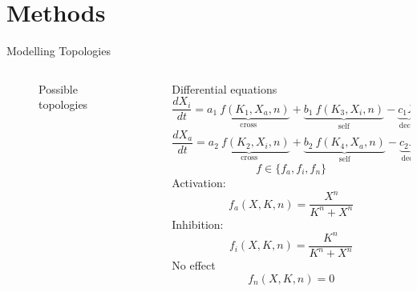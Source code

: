 \documentclass[aspectratio=169,9pt]{beamer}
\begin{document}
    \section{Methods}
    \begin{frame}{Modelling Topologies}
        \begin{columns}
            \begin{column}{0.3\textwidth}
                \begin{figure}
                    \centering
                    \caption{Possible topologies}
                \end{figure}
            \end{column}
            \pause
            \begin{column}{0.63\textwidth}
                Differential equations
                \begin{equation}
                    \frac{dX_i}{dt} = \underbrace{a_1\ f(K_1,X_a,n)}_\text{cross} + \underbrace{b_1\ f(K_3,X_i,n)}_\text{self} - \underbrace{c_1 X_i}_\text{decay}
                \end{equation}
                \begin{equation}
                    \frac{dX_a}{dt} = \underbrace{a_2\ f(K_2,X_i,n)}_\text{cross} + \underbrace{b_2\ f(K_4,X_a,n)}_\text{self} - \underbrace{c_2 X_a}_\text{decay}
                \end{equation}
                $$f \in \{ f_a, f_i, f_n\}$$
                \pause
                Activation:
                \begin{equation}
                    f_a(X,K,n) = \frac{{X}^n}{{K}^n+{X}^n}
                \end{equation}
                Inhibition:
                \begin{equation}
                    f_i(X,K,n) = \frac{{K}^n}{{K}^n+{X}^n}
                \end{equation}
                No effect
                \begin{equation}
                    f_n(X,K,n) = 0
                \end{equation}
            \end{column}
        \end{columns}
    \end{frame}
\end{document}
